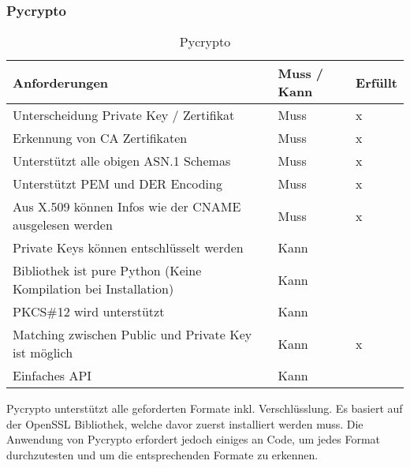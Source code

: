 \subsubsection{Pycrypto}
\begin{table}[H]
\centering
    \begin{tabular}{|p{12cm}|l|l|}
    \hline
    \rowcolor{lightblue}
    Anforderungen & Muss / Kann & Erfüllt   \\ \hline
	Unterscheidung Private Key / Zertifikat	&	Muss & x \\ \hline	
	Erkennung von CA Zertifikaten	&	Muss	& x \\ \hline	
	Unterstützt alle obigen ASN.1 Schemas	&	Muss	& x \\ \hline		
	Unterstützt PEM und DER Encoding	&	Muss	&  x \\ \hline	
	Aus X.509 können Infos wie der CNAME ausgelesen werden &	Muss	& x \\ \hline	
	Private Keys können entschlüsselt werden &	Kann &  \\ \hline
	Bibliothek ist pure Python (Keine Kompilation bei Installation) &	Kann	&   \\ \hline
	PKCS\#12 wird unterstützt &	Kann &  \\ \hline
	Matching zwischen Public und Private Key ist möglich &	Kann &  x \\ \hline
	Einfaches API &	Kann &  \\ \hline
	\end{tabular}
    \caption[Pycrypto]{Pycrypto}
\end{table}

Pycrypto unterstützt alle geforderten Formate inkl. Verschlüsslung. Es basiert auf der OpenSSL Bibliothek, welche davor zuerst installiert werden muss. Die Anwendung von Pycrypto erfordert jedoch einiges an Code, um jedes Format durchzutesten und um die entsprechenden Formate zu erkennen.


